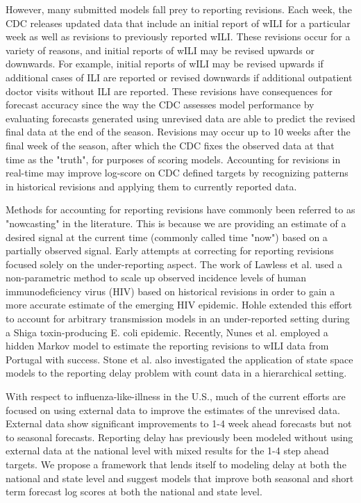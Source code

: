 \documentclass{umassthesis}          %
\begin{document}
However, many submitted models fall prey to reporting revisions. Each week, the CDC releases updated data that include an initial report of wILI for a particular week as well as revisions to previously reported wILI. These revisions occur for a variety of reasons, and initial reports of wILI may be revised upwards or downwards. For example, initial reports of wILI may be revised upwards if additional cases of ILI are reported or revised downwards if additional outpatient doctor visits without ILI are reported. These revisions have consequences for forecast accuracy since the way the CDC assesses model performance by evaluating forecasts generated using unrevised data are able to predict the revised final data at the end of the season.\cite{reich2019collaborative} Revisions may occur up to 10 weeks after the final week of the season, after which the CDC fixes the observed data at that time as the "truth", for purposes of scoring models. Accounting for revisions in real-time may improve log-score on CDC defined targets by recognizing patterns in historical revisions and applying them to currently reported data. 

Methods for accounting for reporting revisions have commonly been referred to as "nowcasting" in the literature. This is because we are providing an estimate of a desired signal at the current time (commonly called time "now") based on a partially observed signal.\cite{lawless1994adjustments} \cite{lampos}\cite{johansson2014nowcasting} Early attempts at correcting for reporting revisions focused solely on the under-reporting aspect. \cite{kalbfleisch1989inference} The work of Lawless et al. used a non-parametric method to scale up observed incidence levels of human immunodeficiency virus (HIV) based on historical revisions in order to gain a more accurate estimate of the emerging HIV epidemic. Hohle extended this effort to account for arbitrary transmission models in an under-reported setting during a Shiga toxin-producing E. coli epidemic. \cite{hohle2014bayesian} Recently, Nunes et al. employed a hidden Markov model to estimate the reporting revisions to wILI data from Portugal with success. \cite{nunes2013nowcasting} Stone et al. also investigated the application of state space models to the reporting delay problem with count data in a hierarchical setting.\cite{stoner2019multivariate}

With respect to influenza-like-illness in the U.S., much of the current efforts are focused on using external data to improve the estimates of the unrevised data. External data show significant improvements to 1-4 week ahead forecasts but not to seasonal forecasts.\cite{osthus2019even} Reporting delay has previously been modeled without using external data at the national level with mixed results for the 1-4 step ahead targets. \cite{brooks2018nonmechanistic} We propose a framework that lends itself to modeling delay at both the national and state level and suggest models that improve both seasonal and short term forecast log scores at both the national and state level.
\end{document}

